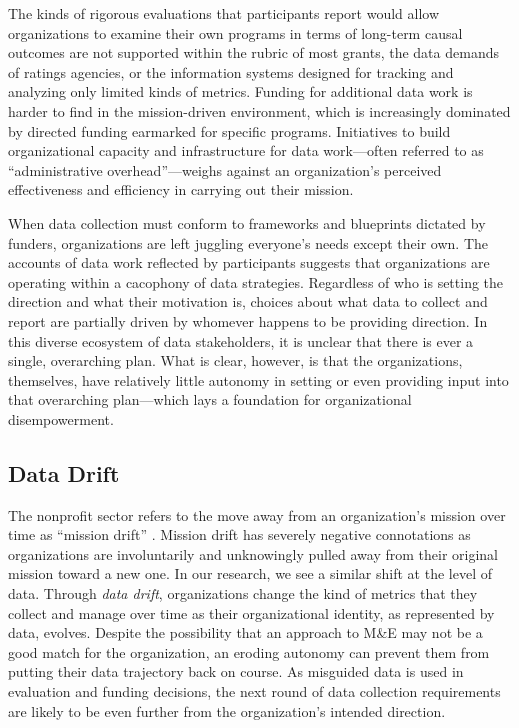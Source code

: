 The kinds of rigorous evaluations that participants report would allow organizations to examine their own programs in terms of long-term causal outcomes are not supported within the rubric of most grants, the data demands of ratings agencies, or the information systems designed for tracking and analyzing only limited kinds of metrics. Funding for additional data work is harder to find in the mission-driven environment, which is increasingly dominated by directed funding earmarked for specific programs. Initiatives to build organizational capacity and infrastructure for data work---often referred to as “administrative overhead”---weighs against an organization’s perceived effectiveness and efficiency in carrying out their mission.

When data collection must conform to frameworks and blueprints dictated by funders, organizations are left juggling everyone’s needs except their own. The accounts of data work reflected by participants suggests that organizations are operating within a cacophony of data strategies. Regardless of who is setting the direction and what their motivation is, choices about what data to collect and report are partially driven by whomever happens to be providing direction. In this diverse ecosystem of data stakeholders, it is unclear that there is ever a single, overarching plan. What is clear, however, is that the organizations, themselves, have relatively little autonomy in setting or even providing input into that overarching plan---which lays a foundation for organizational disempowerment.

\subsection{Data Drift}
The nonprofit sector refers to the move away from an organization’s mission over time as “mission drift” \citep{Moore2000Managing}. Mission drift has severely negative connotations as organizations are involuntarily and unknowingly pulled away from their original mission toward a new one. In our research, we see a similar shift at the level of data. Through \textit{data drift}, organizations change the kind of metrics that they collect and manage over time as their organizational identity, as represented by data, evolves. Despite the possibility that an approach to M\&E may not be a good match for the organization, an eroding autonomy can prevent them from putting their data trajectory back on course. As misguided data is used in evaluation and funding decisions, the next round of data collection requirements are likely to be even further from the organization’s intended direction.

